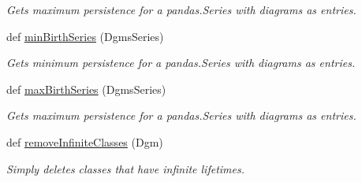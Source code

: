 \begin{DoxyCompactItemize}
\begin{DoxyCompactList}\small\item\em Gets maximum persistence for a pandas.\+Series with diagrams as entries. \end{DoxyCompactList}\item 
def \hyperlink{namespaceteaspoon_1_1_t_d_a_1_1_persistence_a1db04f6a997b34a930bc3e28d2cb709e}{min\+Birth\+Series} (Dgms\+Series)
\begin{DoxyCompactList}\small\item\em Gets minimum persistence for a pandas.\+Series with diagrams as entries. \end{DoxyCompactList}\item 
def \hyperlink{namespaceteaspoon_1_1_t_d_a_1_1_persistence_a866a47a538d7042da1de685bed83d00e}{max\+Birth\+Series} (Dgms\+Series)
\begin{DoxyCompactList}\small\item\em Gets maximum persistence for a pandas.\+Series with diagrams as entries. \end{DoxyCompactList}\item 
def \hyperlink{namespaceteaspoon_1_1_t_d_a_1_1_persistence_abdeeb8bb1d1c2c82b26d2e55b0fd42a3}{remove\+Infinite\+Classes} (Dgm)\hypertarget{namespaceteaspoon_1_1_t_d_a_1_1_persistence_abdeeb8bb1d1c2c82b26d2e55b0fd42a3}{}\label{namespaceteaspoon_1_1_t_d_a_1_1_persistence_abdeeb8bb1d1c2c82b26d2e55b0fd42a3}

\begin{DoxyCompactList}\small\item\em Simply deletes classes that have infinite lifetimes. \end{DoxyCompactList}\end{DoxyCompactItemize}
